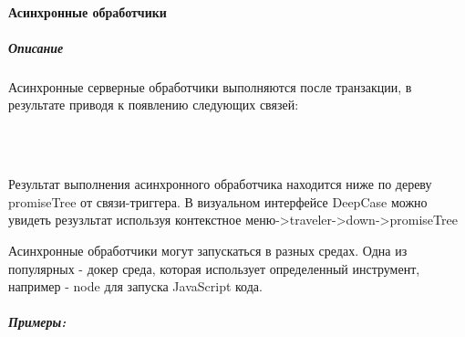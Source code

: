 \documentclass{article}
\begin{document}
\paragraph{Асинхронные обработчики}
\subparagraph{Описание}
Асинхронные серверные обработчики выполняются после транзакции, в результате
приводя к появлению следующих связей: \\
\newenvironment{handler_success_result_info}
{%
  \noindent При успешном выполнении: Связь\textendash триггер \textendash Then\textendash > Promise \textendash Resolved\textendash > \\
  PromiseResult {(с object value)} 
}
{}
\newenvironment{handler_fail_result_info}
{%
  При ошибке: Связь\textendash триггер \textendash Then\textendash > Promise \textendash Rejected\textendash > PromiseResult {(с object value)} 
}
{}
\begin{handler_success_result_info}
\end{handler_success_result_info}\\
\begin{handler_fail_result_info}
\end{handler_fail_result_info}\\
Результат выполнения асинхронного обработчика находится ниже по дереву
promiseTree от связи-триггера. В визуальном интерфейсе DeepCase можно увидеть
резузльтат используя контекстное меню->traveler->down->promiseTree

Асинхронные обработчики могут запускаться в разных средах. Одна из популярных -
докер среда, которая использует определенный инструмент, например - node для
запуска JavaScript кода.
\subparagraph{Примеры:}
\end{document}
